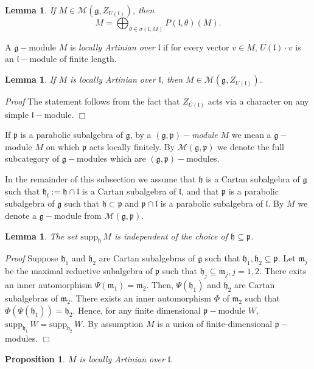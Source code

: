 \documentclass[10pt]{amsart}
\newtheorem{lem}[theo]{Lemma}
\newtheorem{prop}[theo]{Proposition}
\renewenvironment{proof}{ \emph{Proof}}{$\Box$}
\newcommand{\supp}{\mathrm{supp}}
\renewcommand{\gg}{\mathfrak{g}}
\newcommand{\hh}{\mathfrak{h}}
\renewcommand{\ll}{\mathfrak{l}}
\newcommand{\mm}{\mathfrak{m}}
\newcommand{\pp}{\mathfrak{p}}
\begin{document}
\begin{lem}\label{lem:1}
 If $M \in \mathcal{M}(\gg,Z_{U(\ll)})$, then 
 $$M = \bigoplus_{\theta \in \sigma(\ll,M)} P(\ll,\theta)(M).$$
\end{lem}

A $\gg-$module $M$ is \textit{locally Artinian over} $\ll$ if for every vector $v \in M$, $U(\ll)\cdot v$ is an $\ll-$module of finite length.

\begin{lem}\label{lem:2}
 If $M$ is locally Artinian over $\ll$, then $M \in \mathcal{M}(\gg, Z_{U(\ll)})$.
\end{lem}

\begin{proof}
The statement follows from the fact that $Z_{U(\ll)}$ acts via a character on any simple $\ll-$module.
\end{proof}

If $\pp$ is a parabolic subalgebra of $\gg$, by a $(\gg,\pp)-$\textit{module} $M$ we mean a $\gg-$module $M$ on which $\pp$ acts locally finitely. By $\mathcal{M}(\gg,\pp)$ we denote the full subcategory of $\gg-$modules which are $(\gg,\pp)-$modules.

In the remainder of this subsection we assume that $\hh$ is a Cartan subalgebra of $\gg$ such that $\hh_\ll :=  \hh \cap \ll$ is a Cartan subalgebra of $\ll$, and that $\pp$ is a parabolic subalgebra of $\gg$ such that $\hh \subset \pp$ and $\pp \cap \ll$ is a parabolic subalgebra of $\ll$. By $M$ we denote a $\gg-$module from $\mathcal{M}(\gg,\pp)$.

\begin{lem}\label{lemma:3}
 The set $\supp_\hh\, M$ is independent of the choice of $\hh \subseteq \pp$.
\end{lem}

\begin{proof}
 Suppose $\hh_1$ and $\hh_2$ are Cartan subalgebras of $\gg$ such that $\hh_1, \hh_2 \subseteq \pp$. Let $\mm_j$ be the maximal reductive subalgebra of $\pp$ such that $\hh_j \subseteq \mm_j, j=1,2$. There exits an inner automorphism $\Psi(\mm_1) = \mm_2$. Then, $\Psi(\hh_1)$ and $\hh_2$ are Cartan subalgebras of $\mm_2$. There exists an inner automorphism $\Phi$ of $\mm_2$ such that $\Phi(\Psi(\hh_1)) = \hh_2$. Hence, for any finite dimensional $\pp-$module $W$, $\supp_{\hh_1}\,W = \supp_{\hh_2}\,W$. By assumption $M$ is a union of finite-dimensional $\pp-$modules. 
\end{proof}

\begin{prop}\label{prop:1}
 $M$ is locally Artinian over $\ll$.
\end{prop}
\end{document}
